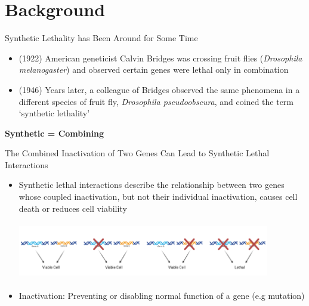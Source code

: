 \documentclass{beamer}
\begin{document}
	\section{Background}
	\begin{frame}{Synthetic Lethality has Been Around for Some Time}
		\begin{itemize}
			\item (1922) American geneticist Calvin Bridges was crossing fruit flies (\textit{Drosophila melanogaster}) and observed certain genes were lethal only in combination \newline
			\item (1946) Years later, a colleague of Bridges observed the same phenomena in a different species of fruit fly, \textit{Drosophila pseudoobscura}, and coined the term `synthetic lethality' \newline
		\end{itemize}
		
		\centering
		\huge \textbf{Synthetic = Combining}
		
		
	\end{frame}
	
	\begin{frame}{The Combined Inactivation of Two Genes Can Lead to Synthetic Lethal Interactions}
		\label{link1}
		
		\begin{itemize}
			\item Synthetic lethal interactions describe the relationship between two genes whose coupled inactivation, but not their individual inactivation, causes cell death or reduces cell viability \newline
				
			\includegraphics[width=11cm, height=2.5cm]{slbasic.png} 
		
			\item Inactivation: Preventing or disabling normal function of a gene (e.g mutation)
		\end{itemize}
		
	\end{frame}
\end{document}
